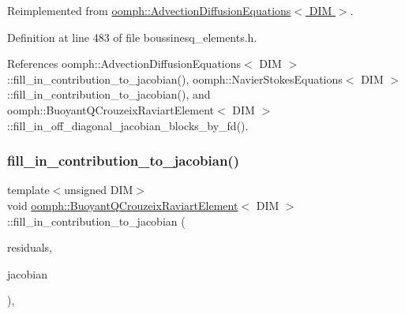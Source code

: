 Reimplemented from \hyperlink{classoomph_1_1AdvectionDiffusionEquations_a6ec1e0f92fa79998be9340ecfda4bcd5}{oomph\+::\+Advection\+Diffusion\+Equations$<$ D\+I\+M $>$}.



Definition at line 483 of file boussinesq\+\_\+elements.\+h.



References oomph\+::\+Advection\+Diffusion\+Equations$<$ D\+I\+M $>$\+::fill\+\_\+in\+\_\+contribution\+\_\+to\+\_\+jacobian(), oomph\+::\+Navier\+Stokes\+Equations$<$ D\+I\+M $>$\+::fill\+\_\+in\+\_\+contribution\+\_\+to\+\_\+jacobian(), and oomph\+::\+Buoyant\+Q\+Crouzeix\+Raviart\+Element$<$ D\+I\+M $>$\+::fill\+\_\+in\+\_\+off\+\_\+diagonal\+\_\+jacobian\+\_\+blocks\+\_\+by\+\_\+fd().

\mbox{\label{classoomph_1_1BuoyantQCrouzeixRaviartElement_a7bd9313dd697c1219cee4a65692388b5}} 
\subsubsection{\texorpdfstring{fill\+\_\+in\+\_\+contribution\+\_\+to\+\_\+jacobian()}{fill\_in\_contribution\_to\_jacobian()}\hspace{0.1cm}{\footnotesize\ttfamily [3/3]}}
{\footnotesize\ttfamily template$<$unsigned D\+IM$>$ \\
void \hyperlink{classoomph_1_1BuoyantQCrouzeixRaviartElement}{oomph\+::\+Buoyant\+Q\+Crouzeix\+Raviart\+Element}$<$ D\+IM $>$\+::fill\+\_\+in\+\_\+contribution\+\_\+to\+\_\+jacobian (\begin{DoxyParamCaption}\item[{\hyperlink{classoomph_1_1Vector}{Vector}$<$ double $>$ \&}]{residuals,  }\item[{\hyperlink{classoomph_1_1DenseMatrix}{Dense\+Matrix}$<$ double $>$ \&}]{jacobian }\end{DoxyParamCaption})\hspace{0.3cm}{\ttfamily [inline]}, {\ttfamily [virtual]}}



